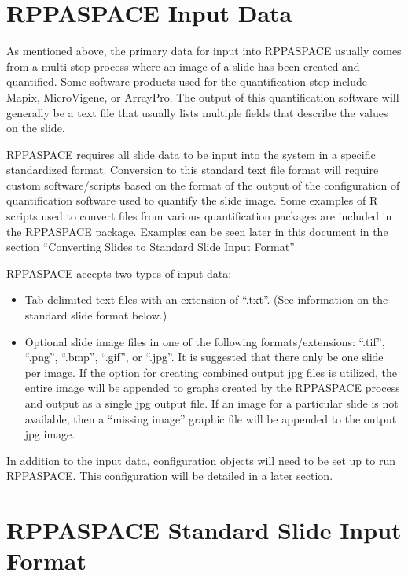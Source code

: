 \documentclass[
]{article}
\providecommand{\tightlist}{%
  \setlength{\itemsep}{0pt}\setlength{\parskip}{0pt}}
\begin{document}
\hypertarget{input_data}{%
\section{RPPASPACE Input Data}\label{input_data}}

As mentioned above, the primary data for input into RPPASPACE usually
comes from a multi-step process where an image of a slide has been
created and quantified. Some software products used for the
quantification step include Mapix, MicroVigene, or ArrayPro. The output
of this quantification software will generally be a text file that
usually lists multiple fields that describe the values on the slide.

RPPASPACE requires all slide data to be input into the system in a
specific standardized format. Conversion to this standard text file
format will require custom software/scripts based on the format of the
output of the configuration of quantification software used to quantify
the slide image. Some examples of R scripts used to convert files from
various quantification packages are included in the RPPASPACE package.
Examples can be seen later in this document in the section ``Converting
Slides to Standard Slide Input Format''

RPPASPACE accepts two types of input data:

\begin{itemize}
\tightlist
\item
  Tab-delimited text files with an extension of ``.txt''. (See
  information on the standard slide format below.)
\item
  Optional slide image files in one of the following formats/extensions:
  ``.tif'', ``.png'', ``.bmp'', ``.gif'', or ``.jpg''. It is suggested
  that there only be one slide per image. If the option for creating
  combined output jpg files is utilized, the entire image will be
  appended to graphs created by the RPPASPACE process and output as a
  single jpg output file. If an image for a particular slide is not
  available, then a ``missing image'' graphic file will be appended to
  the output jpg image.
\end{itemize}

In addition to the input data, configuration objects will need to be set
up to run RPPASPACE. This configuration will be detailed in a later
section.

\hypertarget{slide_input_format}{%
\section{RPPASPACE Standard Slide Input
Format}\label{slide_input_format}}
\end{document}
